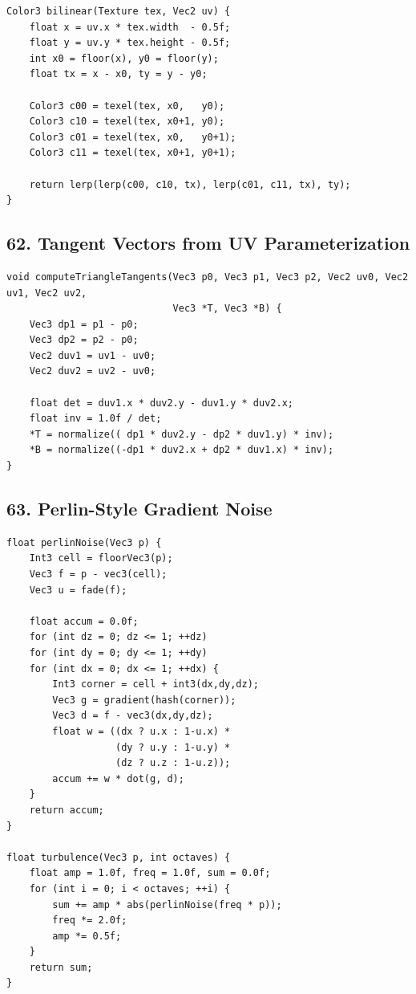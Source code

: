 \documentclass[10pt,letterpaper]{article}
\begin{document}
\begin{verbatim}
Color3 bilinear(Texture tex, Vec2 uv) {
    float x = uv.x * tex.width  - 0.5f;
    float y = uv.y * tex.height - 0.5f;
    int x0 = floor(x), y0 = floor(y);
    float tx = x - x0, ty = y - y0;

    Color3 c00 = texel(tex, x0,   y0);
    Color3 c10 = texel(tex, x0+1, y0);
    Color3 c01 = texel(tex, x0,   y0+1);
    Color3 c11 = texel(tex, x0+1, y0+1);

    return lerp(lerp(c00, c10, tx), lerp(c01, c11, tx), ty);
}
\end{verbatim}

\subsection{62. Tangent Vectors from UV Parameterization}

\begin{verbatim}
void computeTriangleTangents(Vec3 p0, Vec3 p1, Vec3 p2, Vec2 uv0, Vec2 uv1, Vec2 uv2,
                             Vec3 *T, Vec3 *B) {
    Vec3 dp1 = p1 - p0;
    Vec3 dp2 = p2 - p0;
    Vec2 duv1 = uv1 - uv0;
    Vec2 duv2 = uv2 - uv0;

    float det = duv1.x * duv2.y - duv1.y * duv2.x;
    float inv = 1.0f / det;
    *T = normalize(( dp1 * duv2.y - dp2 * duv1.y) * inv);
    *B = normalize((-dp1 * duv2.x + dp2 * duv1.x) * inv);
}
\end{verbatim}

\subsection{63. Perlin-Style Gradient Noise}

\begin{verbatim}
float perlinNoise(Vec3 p) {
    Int3 cell = floorVec3(p);
    Vec3 f = p - vec3(cell);
    Vec3 u = fade(f);

    float accum = 0.0f;
    for (int dz = 0; dz <= 1; ++dz)
    for (int dy = 0; dy <= 1; ++dy)
    for (int dx = 0; dx <= 1; ++dx) {
        Int3 corner = cell + int3(dx,dy,dz);
        Vec3 g = gradient(hash(corner));
        Vec3 d = f - vec3(dx,dy,dz);
        float w = ((dx ? u.x : 1-u.x) *
                   (dy ? u.y : 1-u.y) *
                   (dz ? u.z : 1-u.z));
        accum += w * dot(g, d);
    }
    return accum;
}

float turbulence(Vec3 p, int octaves) {
    float amp = 1.0f, freq = 1.0f, sum = 0.0f;
    for (int i = 0; i < octaves; ++i) {
        sum += amp * abs(perlinNoise(freq * p));
        freq *= 2.0f;
        amp *= 0.5f;
    }
    return sum;
}
\end{verbatim}
\end{document}
